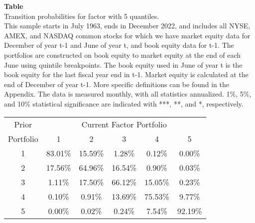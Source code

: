 \begin{table*}[ht!]
\raggedright
{}
\label{tab: transition_probs_me_with_5_quantiles}
\textbf{Table \thetable} \\
Transition probabilities for factor with 5 quantiles. \\
\hspace*{1em}This sample starts in July 1963, ends in December 2022, and includes all NYSE, AMEX, and NASDAQ common stocks for which we have market equity data for December of year t-1 and June of year t, and book equity data for t-1. The portfolios are constructed on book equity to market equity at the end of each June using quintile breakpoints.  The book equity used in June of year t is the book equity for the last fiscal year end in t-1.  Market equity is calculated at the end of December of year t-1.  More specific definitions can be found in the Appendix.  The data is measured monthly, with all statistics annualized.  1\%, 5\%, and 10\% statistical significance are indicated with ***, **, and *, respectively. \\
\vspace{0.5em}
\centering
\begin{adjustbox}{max width=\textwidth}
\begin{tabular}{@{}cccccc@{}}
\toprule
Prior & \multicolumn{5}{c}{Current Factor Portfolio} \\
Portfolio & 1 & 2 & 3 & 4 & 5 \\
\midrule
1 & 83.01\% & 15.59\% & 1.28\% & 0.12\% & 0.00\% \\
2 & 17.56\% & 64.96\% & 16.54\% & 0.90\% & 0.03\% \\
3 & 1.11\% & 17.50\% & 66.12\% & 15.05\% & 0.23\% \\
4 & 0.10\% & 0.91\% & 13.69\% & 75.53\% & 9.77\% \\
5 & 0.00\% & 0.02\% & 0.24\% & 7.54\% & 92.19\% \\
\bottomrule
\end{tabular}
\end{adjustbox}
\end{table*}